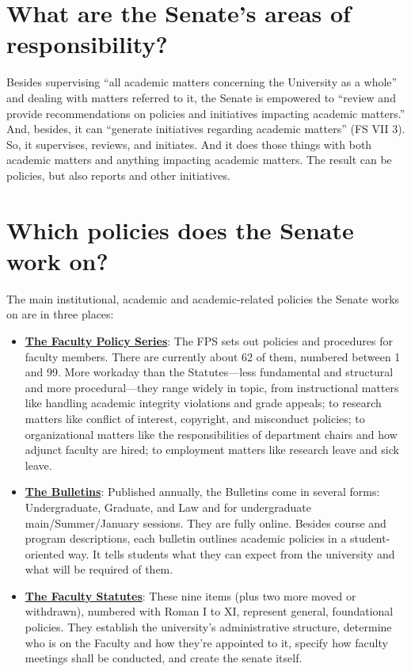 \documentclass[12pt]{article}
\providecommand{\tightlist}{}
\begin{document}
\section{What are the Senate's areas of
responsibility?}\label{what-are-the-senates-areas-of-responsibility}

Besides supervising ``all academic matters concerning the University as
a whole'' and dealing with matters referred to it, the Senate is
empowered to ``review and provide recommendations on policies and
initiatives impacting academic matters.'' And, besides, it can
``generate initiatives regarding academic matters'' (FS VII 3). So, it
supervises, reviews, and initiates. And it does those things with both
academic matters and anything impacting academic matters. The result can
be policies, but also reports and other initiatives.

\section{Which policies does the Senate work
on?}\label{which-policies-does-the-senate-work-on}

The main institutional, academic and academic-related policies the
Senate works on are in three places:

\begin{itemize}
\tightlist
\item
  \textbf{\href{https://www.hofstra.edu/senate/faculty-policy-series.html}{The
  Faculty Policy Series}}: The FPS sets out policies and procedures for
  faculty members. There are currently about 62 of them, numbered
  between 1 and 99. More workaday than the Statutes---less fundamental
  and structural and more procedural---they range widely in topic, from
  instructional matters like handling academic integrity violations and
  grade appeals; to research matters like conflict of interest,
  copyright, and misconduct policies; to organizational matters like the
  responsibilities of department chairs and how adjunct faculty are
  hired; to employment matters like research leave and sick leave.
\item
  \textbf{\href{https://bulletin.hofstra.edu}{The Bulletins}}: Published
  annually, the Bulletins come in several forms: Undergraduate,
  Graduate, and Law and for undergraduate main/Summer/January sessions.
  They are fully online. Besides course and program descriptions, each
  bulletin outlines academic policies in a student-oriented way. It
  tells students what they can expect from the university and what will
  be required of them.
\item
  \textbf{\href{https://www.hofstra.edu/sites/default/files/2024-04/facultystatutes.pdf}{The
  Faculty Statutes}}: These nine items (plus two more moved or
  withdrawn), numbered with Roman I to XI, represent general,
  foundational policies. They establish the university's administrative
  structure, determine who is on the Faculty and how they're appointed
  to it, specify how faculty meetings shall be conducted, and create the
  senate itself.
\end{itemize}
\end{document}

